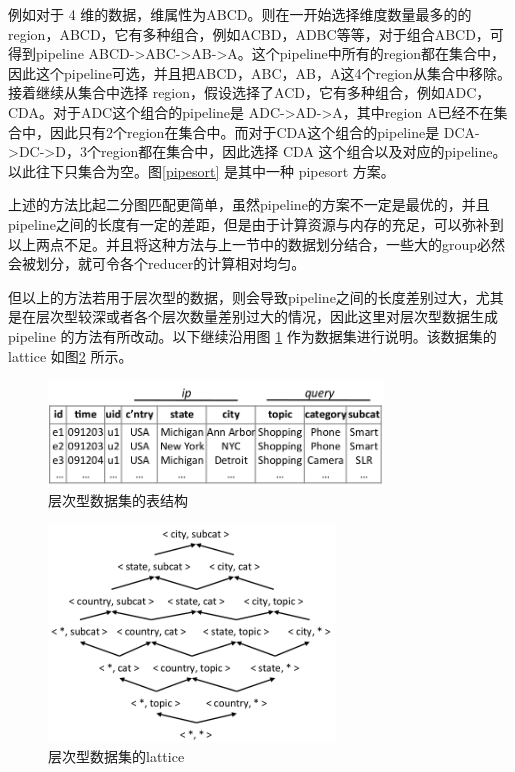 例如对于 4 维的数据，维属性为ABCD。则在一开始选择维度数量最多的的 region，ABCD，它有多种组合，例如ACBD，ADBC等等，对于组合ABCD，可得到pipeline ABCD-\textgreater ABC-\textgreater AB-\textgreater A。这个pipeline中所有的region都在集合中，因此这个pipeline可选，并且把ABCD，ABC，AB，A这4个region从集合中移除。接着继续从集合中选择 region，假设选择了ACD，它有多种组合，例如ADC，CDA。对于ADC这个组合的pipeline是  ADC-\textgreater AD-\textgreater A，其中region A已经不在集合中，因此只有2个region在集合中。而对于CDA这个组合的pipeline是  DCA-\textgreater DC-\textgreater D，3个region都在集合中，因此选择 CDA 这个组合以及对应的pipeline。以此往下只集合为空。图\ref{pipesort} 是其中一种 pipesort 方案。

上述的方法比起二分图匹配更简单，虽然pipeline的方案不一定是最优的，并且pipeline之间的长度有一定的差距，但是由于计算资源与内存的充足，可以弥补到以上两点不足。并且将这种方法与上一节中的数据划分结合，一些大的group必然会被划分，就可令各个reducer的计算相对均匀。

但以上的方法若用于层次型的数据，则会导致pipeline之间的长度差别过大，尤其是在层次型较深或者各个层次数量差别过大的情况，因此这里对层次型数据生成 pipeline 的方法有所改动。以下继续沿用图 \ref{dataset_table} 作为数据集进行说明。该数据集的 lattice 如图\ref{dataset_lattice} 所示。



\begin{figure}[!htb]
\centering\includegraphics[width=3.5in]{picture/ch_datacube_mr/dataset_table} 
\caption{层次型数据集的表结构}\label{dataset_table} 
\end{figure} 

\begin{figure}[!htb]
\centering\includegraphics[width=3in]{picture/ch_datacube_mr/dataset_lattice} 
\caption{层次型数据集的lattice}\label{dataset_lattice} 
\end{figure} 

